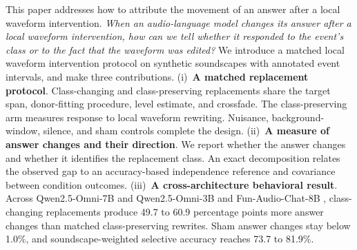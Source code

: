 This paper addresses how to attribute the movement of an answer after a local
waveform intervention. \emph{When an audio-language model changes its answer
after a local waveform intervention, how can we tell whether it responded to
the event's class or to the fact that the waveform was edited?} We introduce a
matched local waveform intervention protocol on synthetic soundscapes with
annotated event intervals, and make three contributions.
(i)~\textbf{A matched replacement protocol}. Class-changing and class-preserving
replacements share the target span, donor-fitting procedure, level estimate,
and crossfade. The class-preserving arm measures response to local waveform
rewriting. Nuisance, background-window, silence, and sham controls complete the
design.
(ii)~\textbf{A measure of answer changes and their direction}. We report
whether the answer changes and whether it identifies the replacement class.
An exact decomposition relates the observed gap to an accuracy-based
independence reference and covariance between condition outcomes.
(iii)~\textbf{A cross-architecture behavioral result}. Across Qwen2.5-Omni-7B
and Qwen2.5-Omni-3B \cite{qwen25omni2025} and Fun-Audio-Chat-8B
\cite{funaudiochat2026}, class-changing replacements produce 49.7 to 60.9
percentage points more answer changes than matched class-preserving rewrites.
Sham answer changes stay below 1.0\%, and soundscape-weighted selective
accuracy reaches 73.7 to 81.9\%.
